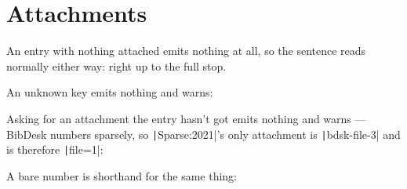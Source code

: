 \section{Attachments}

An entry with nothing attached emits nothing at all, so the sentence reads
normally either way: right up to the full stop.

An unknown key emits nothing and warns: 

Asking for an attachment the entry hasn't got emits nothing and warns —
BibDesk numbers sparsely, so \texttt|Sparse:2021|'s only attachment is \texttt|bdsk-file-3|
and is therefore \texttt|file=1|: 

A bare number is shorthand for the same thing: 

